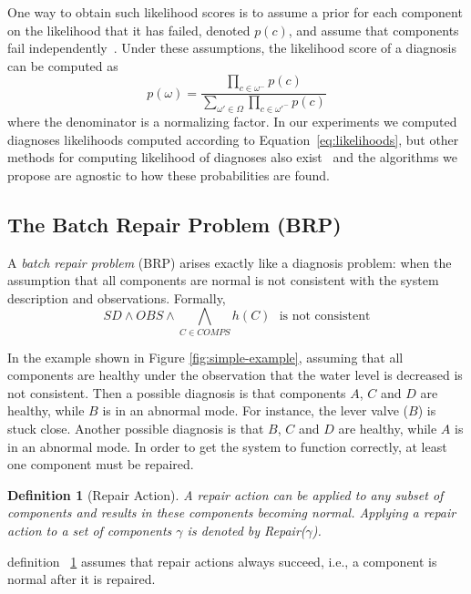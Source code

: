 \documentclass[review]{elsarticle}
\newtheorem{definition}{Definition}
\newcommand{\COMPS}{\textit{COMPS}}
\newcommand{\SD}{\textit{SD}}
\newcommand{\OBS}{\textit{OBS}}
\begin{document}
One way to obtain such likelihood scores is to assume a prior for each component on the likelihood that it has failed, denoted $p(c)$, and assume that components fail independently~\cite{Stern17shelly}. 
Under these assumptions, the likelihood score of a diagnosis can be computed as
\begin{equation}
\displaystyle p(\omega)=\frac{\prod_{c\in\omega^{-}} p(c)}{\sum_{\omega'\in\Omega}{\prod_{c\in\omega'^{-}} p(c)}}
\label{eq:likelihoods}
\end{equation}
where the denominator is a normalizing factor. 
In our experiments we computed diagnoses likelihoods computed according to Equation~\ref{eq:likelihoods}, 
but other methods for computing likelihood of diagnoses also exist~\cite{mengshoel2010probabilistic} and the algorithms we propose are agnostic to how these probabilities are found. 

\subsection{The Batch Repair Problem (BRP)}

A {\em batch repair problem} (BRP) arises exactly like a diagnosis problem: when the assumption that all components are normal is not consistent with the system description and observations. Formally,
\[ \SD \wedge \OBS \wedge \bigwedge_{C\in \COMPS} h(C) ~~~ \text{is not consistent} \]

In the example shown in Figure \ref{fig:simple-example}, assuming that all components are healthy under the observation that the water level is decreased is not consistent. Then a possible diagnosis is that components $A$, $C$ and $D$ are healthy, while $B$ is in an abnormal mode. For instance, the lever valve ($B$) is stuck close. Another possible diagnosis is that $B$, $C$ and $D$ are healthy, while $A$ is in an abnormal mode. In order to get the system to function correctly, at least one component must be repaired.

\begin{definition}[Repair Action]
A repair action can be applied to any subset of components and results in these components becoming normal. Applying a repair action to a set of components $\gamma$ is denoted by Repair($\gamma$).
\label{def:repairAction}
\end{definition}
\noindent definition ~\ref{def:repairAction} assumes that repair actions always succeed, i.e., a component is normal after it is repaired. %
\end{document}
